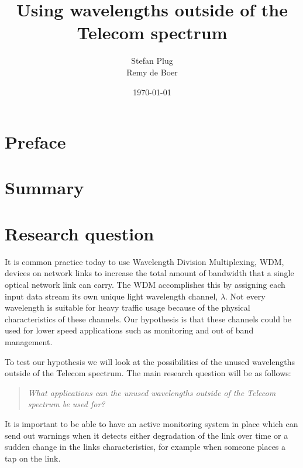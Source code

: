 \documentclass{article}
\begin{document}
\title{Using wavelengths outside of the Telecom spectrum}
\author{Stefan Plug\\Remy de Boer}
\date{\today}
\maketitle

\begin{comment}
\begin{tabular}{|c|c|c|}
\hline 
Version number & Date & Comment \\ 
\hline 
0.1 & 03-01-2013 & Start of of document \\ 
\hline 
\end{tabular} 
\end{comment}

\tableofcontents

\section{Preface}

\section{Summary}

\section{Research question}
It is common practice today to use Wavelength Division Multiplexing, WDM, devices on network links to increase the total amount of bandwidth that a single optical network link can carry. The WDM accomplishes this by assigning each input data stream its own unique light wavelength channel, $\lambda$. 
Not every wavelength is suitable for heavy traffic usage because of the physical characteristics of these channels. Our hypothesis is that these channels could be used for lower speed applications such as monitoring and out of band management.

To test our hypothesis we will look at the possibilities of the unused wavelengths outside of the Telecom spectrum.
The main research question will be as follows:
\begin{quote}
\textit{
What applications can the unused wavelengths outside of the Telecom spectrum be used for?
}
\end{quote}

It is important to be able to have an active monitoring system in place which can send out warnings when it detects either degradation of the link over time or a sudden change in the links characteristics, for example when someone places a tap on the link. 
\end{document}
